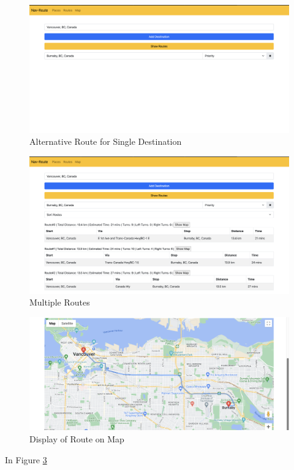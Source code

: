 \documentclass{article}
\begin{document}
\begin{figure}
  \centering
  \includegraphics[width=1\textwidth]{NithishFinal/ARSS1.png}
  \caption{Alternative Route for Single Destination}
  \label{fig:example}
\end{figure}

\begin{figure}
  \centering
  \includegraphics[width=1\textwidth]{NithishFinal/ARSS2.png}
  \caption{Multiple Routes}
  \label{fig:example}
\end{figure}

\begin{figure}
  \centering
  \includegraphics[width=1\textwidth]{NithishFinal/ARSS3.png}
  \caption{Display of Route on Map}
  \label{fig:example}
\end{figure}

In Figure \ref{fig:example}

\end{document}
